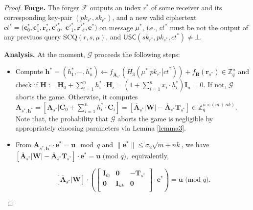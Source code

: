 \documentclass[a4paper,11pt,onecolumn]{elsarticle}
\def\bf{\mathbf}
\begin{document}
\begin{proof}
		 \textbf{Forge.} The forger $\mathcal{F}$  outputs an index  $r^* $ of some receiver and its corresponding key-pair $(pk_{r^*}, sk_{r^*})$, and a new valid ciphertext $ct^*=(\textbf{c}^*_0, \textbf{c}^*_1, \textbf{r}^*_e,\textbf{c}'^*_0,$ $ \textbf{c}'^*_1,\textbf{r}'^*_e, \textbf{e}^*)$ on message $\mu^*$, i.e., $ct^*$  must be not the output of any previuos query SCQ$(r,s,\mu)$, and $\mathsf{USC}(sk_{r^*},pk_{s^*},ct^*) \neq \bot.$ 
			
		\textbf{Analysis.} At the moment, $\mathcal{G}$ proceeds the following steps: 
			\begin{itemize}
				\item Compute $\textbf{h}^*=(h^*_1, \cdots, h^*_n)\gets f_{\overline{\textbf{A}}_{s^*}}(H_3(\mu^*| pk_{r^*}|\overline{ct}^*))+f_{\textbf{B}}(\textbf{r}_{s^*})\in \mathbb{Z}_q^{n}$ and check if $\textbf{H}:=\mathbf{H}_0+\sum_{i=1}^{n}h^*_i\cdot \mathbf{H}_{i}=(1+\sum_{i=1}^{n}x_i \cdot h_i^*)\textbf{I}_n=0$. If not, $\mathcal{G}$ aborts the game. Otherwise, it computes $\textbf{A}_{{s^*},\textbf{h}^*}=[\mathbf{A}_{s^*}|\mathbf{C}_0+\sum_{i=1}^{n}h^*_i\cdot \mathbf{C}_i]=[\overline{\textbf{A}}_{s^*}|\textbf{W}|-\overline{\textbf{A}}_{s^*}\textbf{T}_{s^*}]\in \mathbb{Z}_q^{n \times (m+nk)}$. Note that, the probability that $\mathcal{G}$ aborts the game is negligible by appropriately choosing parameters via Lemma \ref{lemma3}.
				\item From  $\textbf{A}_{s^*,\textbf{h}^*}\cdot \textbf{e}^*=\textbf{u} \!\! \mod q$ and $\|\textbf{e}^*\|\leq \sigma_2\sqrt{m+nk}$, we have $[\overline{\textbf{A}}_{s^*}|\textbf{W}|-\overline{\textbf{A}}_{s^*}\textbf{T}_{s^*}]\cdot \bf{e}^*=\bf{u} \text{ (mod } q),$ equivalently, 
	
	$$[\overline{\textbf{A}}_{s^*}|\textbf{W}] \cdot \left(\begin{bmatrix}
	\mathbf{I}_{\overline{m}} & \textbf{0} &-\mathbf{T}_{s^*} \\
	\textbf{0}&\textbf{I}_{nk}& \textbf{0}\\
	\end{bmatrix} \cdot \bf{e}^*\right)=\bf{u} \text{ (mod } q).$$
	

\end{itemize}
\end{proof}
\end{document}
